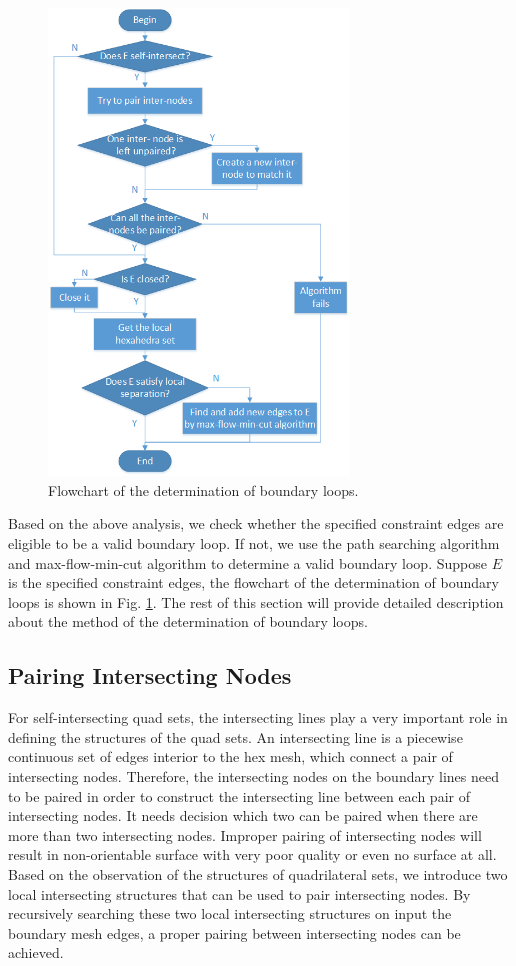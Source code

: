 \documentclass[final,5p,times,twocolumn]{elsarticle}
\begin{document}
\begin{figure}[htbp]
\begin{center}
\includegraphics[width=8cm]{figures/flow_det_loop.png}
\caption{Flowchart of the determination of boundary loops.}
\label{fig:flow_det_loop}
\end{center}
\end{figure}

Based on the above analysis, we check whether the specified constraint edges are eligible to be a valid boundary loop. If not, we use the path searching algorithm and max-flow-min-cut algorithm to determine a valid boundary loop. Suppose $E$ is the specified constraint edges, the flowchart of the determination of boundary loops is shown in Fig. \ref{fig:flow_det_loop}. The rest of this section will provide detailed description about the method of the determination of boundary loops.

\subsection{Pairing Intersecting Nodes}
\label{sec:int_pt_pair}
For self-intersecting quad sets, the intersecting lines play a very important role in defining the structures of the quad sets. An intersecting line is a piecewise continuous set of edges interior to the hex mesh, which connect a pair of intersecting nodes. Therefore, the intersecting nodes on the boundary lines need to be paired in order to construct the intersecting line between each pair of intersecting nodes. It needs decision which two can be paired when there are more than two intersecting nodes. Improper pairing of intersecting nodes will result in non-orientable surface with very poor quality or even no surface at all\cite{Suzuki:2010hn}. Based on the observation of the structures of quadrilateral sets, we introduce two local intersecting structures that can be used to pair intersecting nodes. By recursively searching these two local intersecting structures on input the boundary mesh edges, a proper pairing between intersecting nodes can be achieved.
\end{document}
